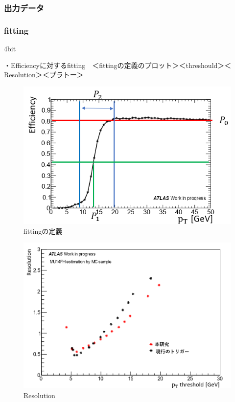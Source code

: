 \subsubsection{出力データ}
\subsubsection{fitting}


4bit


・Efficiencyに対するfitting　＜fittingの定義のプロット＞＜threshould＞＜Resolution＞＜プラトー＞\\
\begin{figure}[tb]
  \centering
  \includegraphics[clip, width=14cm]{fig/4/fitting_def.png}
  \caption{fittingの定義}
  \label{fig:fit_def}
\end{figure}

\begin{figure}[tb]
  \centering
  \includegraphics[clip, width=14cm]{fig/4/resolution_v07_v05.png}
  \caption{Resolution}
  \label{fig:Resolution}
\end{figure}

